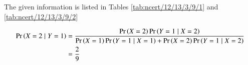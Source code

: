 	The given information is listed in Tables 
	\ref{tab:ncert/12/13/3/9/1}
	and 
	\ref{tab:ncert/12/13/3/9/2}
	\begin{table}[H]\centering
	
	\caption{}
	\label{tab:ncert/12/13/3/9/1}
\end{table}

    \begin{table}[H]\centering
	
	\caption{}
	\label{tab:ncert/12/13/3/9/2}
    \end{table}
\begin{align}
	\Pr\left(X=2 \mid Y=1\right) &= \frac{\Pr\left(X=2\right)\Pr\left(Y=1 \mid X=2\right)}{\Pr\left(X=1\right)\Pr\left(Y=1 \mid X=1\right)+\Pr\left(X=2\right)\Pr\left(Y=1 \mid X=2\right)}
\\
&=\frac{2}{9}
\end{align}
